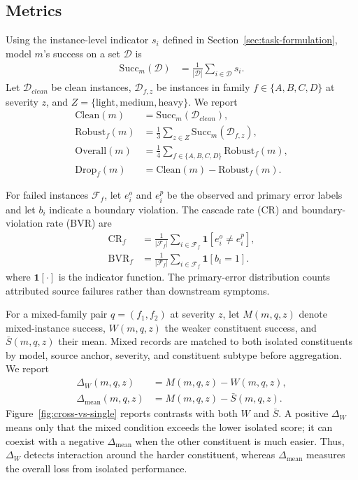 \documentclass[11pt]{article}
\begin{document}
\subsection{Metrics}

Using the instance-level indicator $s_i$ defined in Section~\ref{sec:task-formulation}, model $m$'s success on a set $\mathcal{D}$ is
\begin{align}
\mathrm{Succ}_m(\mathcal{D}) &=
\frac{1}{|\mathcal{D}|}\sum_{i\in \mathcal{D}}s_i.
\end{align}
Let $\mathcal{D}_{clean}$ be clean instances, $\mathcal{D}_{f,z}$ be instances in family $f\in\{A,B,C,D\}$ at severity $z$, and $Z=\{\text{light},\text{medium},\text{heavy}\}$. We report
\begin{align}
\mathrm{Clean}(m) &= \mathrm{Succ}_m(\mathcal{D}_{clean}), \\
\mathrm{Robust}_{f}(m) &= \frac{1}{3}\sum_{z\in Z}
\mathrm{Succ}_m(\mathcal{D}_{f,z}), \\
\mathrm{Overall}(m) &=
\frac{1}{4}\sum_{f\in\{A,B,C,D\}}\mathrm{Robust}_{f}(m), \\
\mathrm{Drop}_{f}(m) &=
\mathrm{Clean}(m)-\mathrm{Robust}_{f}(m).
\end{align}

For failed instances $\mathcal{F}_{f}$, let $e_i^{o}$ and $e_i^{p}$ be the observed and primary error labels and let $b_i$ indicate a boundary violation. The cascade rate (CR) and boundary-violation rate (BVR) are
\begin{align}
\mathrm{CR}_{f} &=
\frac{1}{|\mathcal{F}_{f}|}\sum_{i\in\mathcal{F}_{f}}
\mathbf{1}[e_i^{o}\neq e_i^{p}], \\
\mathrm{BVR}_{f} &=
\frac{1}{|\mathcal{F}_{f}|}\sum_{i\in\mathcal{F}_{f}}
\mathbf{1}[b_i=1].
\end{align}
where $\mathbf{1}[\cdot]$ is the indicator function.
The primary-error distribution counts attributed source failures rather than downstream symptoms.

For a mixed-family pair $q=(f_1,f_2)$ at severity $z$, let $M(m,q,z)$ denote mixed-instance success, $W(m,q,z)$ the weaker constituent success, and $\bar{S}(m,q,z)$ their mean. Mixed records are matched to both isolated constituents by model, source anchor, severity, and constituent subtype before aggregation. We report
\begin{align}
\Delta_{W}(m,q,z) &= M(m,q,z)-W(m,q,z), \\
\Delta_{\mathrm{mean}}(m,q,z) &= M(m,q,z)-\bar{S}(m,q,z).
\end{align}
Figure~\ref{fig:cross-vs-single} reports contrasts with both $W$ and $\bar{S}$.
A positive $\Delta_W$ means only that the mixed condition exceeds the lower isolated score; it can coexist with a negative $\Delta_{\mathrm{mean}}$ when the other constituent is much easier. Thus, $\Delta_W$ detects interaction around the harder constituent, whereas $\Delta_{\mathrm{mean}}$ measures the overall loss from isolated performance.
\end{document}
